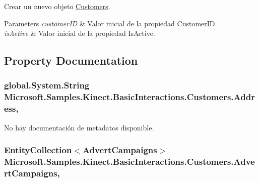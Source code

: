 Crear un nuevo objeto \hyperlink{class_microsoft_1_1_samples_1_1_kinect_1_1_basic_interactions_1_1_customers}{Customers}. 


\begin{DoxyParams}{Parameters}
{\em customer\-I\-D} & Valor inicial de la propiedad Customer\-I\-D.\\
\hline
{\em is\-Active} & Valor inicial de la propiedad Is\-Active.\\
\hline
\end{DoxyParams}


\subsection{Property Documentation}
\hypertarget{class_microsoft_1_1_samples_1_1_kinect_1_1_basic_interactions_1_1_customers_a949e72a6e02f34a09b323423ae70c6c0}{
\subsubsection[{Address}]{\setlength{\rightskip}{0pt plus 5cm}global.\-System.\-String Microsoft.\-Samples.\-Kinect.\-Basic\-Interactions.\-Customers.\-Address\hspace{0.3cm}{\ttfamily [get]}, {\ttfamily [set]}}}\label{class_microsoft_1_1_samples_1_1_kinect_1_1_basic_interactions_1_1_customers_a949e72a6e02f34a09b323423ae70c6c0}


No hay documentación de metadatos disponible. 

\hypertarget{class_microsoft_1_1_samples_1_1_kinect_1_1_basic_interactions_1_1_customers_a789d26281780016a8f25d184f53c8de4}{
\subsubsection[{Advert\-Campaigns}]{\setlength{\rightskip}{0pt plus 5cm}Entity\-Collection$<${\bf Advert\-Campaigns}$>$ Microsoft.\-Samples.\-Kinect.\-Basic\-Interactions.\-Customers.\-Advert\-Campaigns\hspace{0.3cm}{\ttfamily [get]}, {\ttfamily [set]}}}\label{class_microsoft_1_1_samples_1_1_kinect_1_1_basic_interactions_1_1_customers_a789d26281780016a8f25d184f53c8de4}



